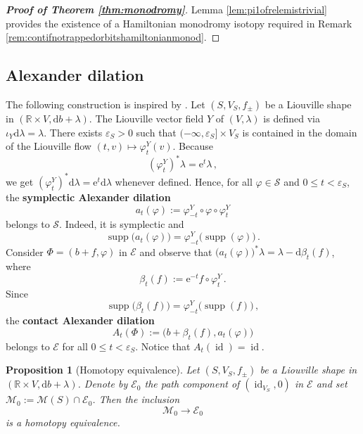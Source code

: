 \documentclass{amsart}
\newtheorem{prop}{Proposition}[subsection]
\theoremstyle{definition}
\newcommand{\rmd}{\mathrm d}
\newcommand{\rme}{\mathrm e}
\newcommand{\EE}{\mathcal E}
\newcommand{\MM}{\mathcal M}
\newcommand{\R}{\mathbb R}
\renewcommand{\SS}{\mathcal S}
\newcommand{\lra}{\longrightarrow}
\DeclareMathOperator{\id}{\mathrm{id}}
\DeclareMathOperator{\supp}{\mathrm{supp}}
\begin{document}
\begin{proof}[{\bf Proof of Theorem \ref{thm:monodromy}}]
Lemma \ref{lem:pi1ofrelemistrivial} provides
the existence of a Hamiltonian monodromy isotopy
required in Remark \ref{rem:contifnotrappedorbitshamiltonianmonod}.
\end{proof}



\subsection{Alexander dilation\label{subsec:alexdilation}}
The following construction is inspired by
\cite[Section 2.6.2]{gei08}.
Let $(S,V_S,f_{\pm})$ be a Liouville shape
in $(\R\times V,\rmd b+\lambda)$.
The Liouville vector field $Y$ of $(V,\lambda)$
is defined via $\iota_Y\rmd\lambda=\lambda$.
There exists $\varepsilon_S>0$ such that
$(-\infty,\varepsilon_S]\times V_S$
is contained in the domain of the Liouville flow
$(t,v)\mapsto\varphi_t^Y(v)$.
Because
\[
(\varphi^Y_t)^*\lambda=\rme^t\lambda
\,,
\]
we get
$(\varphi^Y_t)^*\rmd\lambda=\rme^t\rmd\lambda$
whenever defined.
Hence, for all $\varphi\in\SS$
and $0\leq t<\varepsilon_S$,
the {\bf symplectic Alexander dilation}
\[
a_t(\varphi):=
\varphi^Y_{-t}\circ\varphi\circ\varphi^Y_t
\]
belongs to $\SS$.
Indeed, it is symplectic and
\[
\supp\big(a_t(\varphi)\big)
=
\varphi^Y_{-t}\big(\supp(\varphi)\big)
\,.
\]
Consider $\Phi=(b+f,\varphi)$ in $\EE$
and observe that
$\big(a_t(\varphi)\big)^*\lambda=\lambda-\rmd\beta_t(f)$,
where
\[
\beta_t(f):=\rme^{-t}f\circ\varphi^Y_t
\,.
\]
Since
\[
\supp\big(\beta_t(f)\big)=
\varphi^Y_{-t}\big(\supp(f)\big)
\,,
\]
the {\bf contact Alexander dilation}
\[
A_t(\Phi):=
\Big(b+\beta_t(f),a_t(\varphi)\Big)
\]
belongs to $\EE$
for all $0\leq t<\varepsilon_S$.
Notice that $A_t(\id)=\id$.


\begin{prop}[Homotopy equivalence]
\label{prop:homoequiv}
Let $(S,V_S,f_{\pm})$ be a Liouville shape
in $(\R\times V,\rmd b+\lambda)$.
Denote by $\EE_0$
the path component of $(\id_{V_S},0)$ in $\EE$
and set $\MM_0:=\MM(S)\cap\EE_0$.
Then the inclusion
\[
  \MM_0\lra\EE_0
\]
is a homotopy equivalence.
\end{prop}
\end{document}
